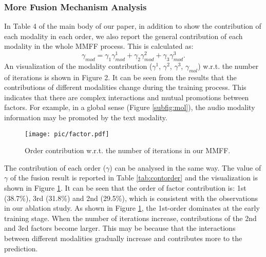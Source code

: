 \documentclass{article}
\begin{document}
\subsubsection{More Fusion Mechanism Analysis}
In Table 4 of the main body of our paper, in addition to show the contribution of each modality in each order, we also report the general contribution of each modality in the whole MMFF process. This is calculated as:
\begin{equation}
   	\gamma_{mod} = \gamma_1 \gamma_{mod}^1 + \gamma_2 \gamma^2_{mod} + \gamma_3\gamma^3_{mod}.
\end{equation}
An visualization of the modality contribution ($\gamma^1$, $\gamma^2$, $\gamma^3$, $\gamma_{mol}$) w.r.t. the number of iterations is shown in Figure 2. It can be seen from the results that the contributions of different modalities change during the training process.
This indicates that there are complex interactions and mutual promotions between factors. For example, in a global sense (Figure \ref{subfig:mol}), the audio modality information may be promoted by the text modality.

\begin{table}[!t]
   	\centering
   	\caption{Order Contribution in MMFF, where the largest contribution is marked in bold.}
   	\label{tab:contorder}
\end{table}
   	
\begin{figure}[!t]
	\centering
	\texttt{[image: pic/factor.pdf]}
	\caption{Order contribution w.r.t. the number of iterations in our MMFF.}
	\label{fig:order}
\end{figure} 

The contribution of each order ($\gamma$) can be analysed in the same way. The value of $\gamma $ of the fusion result is reported in Table \ref{tab:contorder} and the visualization is shown in Figure \ref{fig:order}. It can be seen that the order of factor contribution is: 1st (38.7\%), 3rd (31.8\%) and 2nd (29.5\%), which is consistent with the observations in our ablation study. As shown in Figure \ref{fig:order}, the 1st-order dominates at the early training stage. When the number of iterations increase, contributions of the 2nd and 3rd factors become larger. This may be because that the interactions between different modalities gradually increase and contributes more to the prediction.
\end{document}
